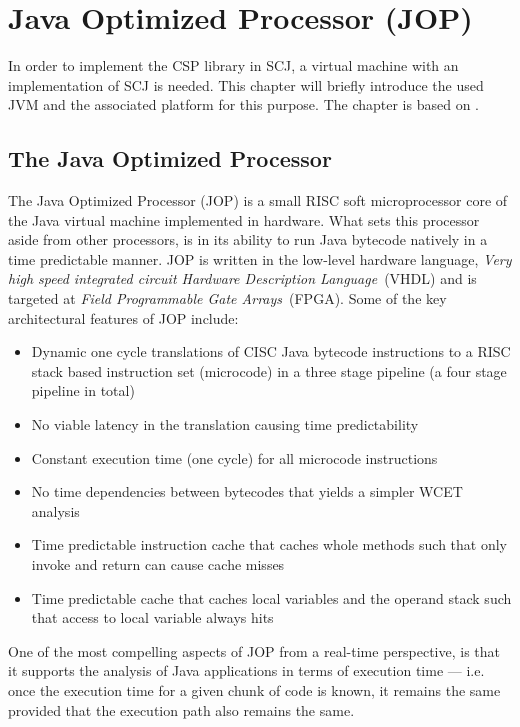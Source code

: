 \chapter{Java Optimized Processor (JOP)}
\label{chapter:jop}
In order to implement the CSP library in SCJ, a virtual machine with an implementation of SCJ is needed. This chapter will briefly introduce the used JVM and the associated platform for this purpose. The chapter is based on \cite{Schoeberl_ajava, JOPDesign, jop:handbook}.

\section{The Java Optimized Processor}
The Java Optimized Processor (JOP) is a small RISC soft microprocessor core of the Java virtual machine implemented in hardware. What sets this processor aside from other processors, is in its ability to run Java bytecode natively in a time predictable manner. JOP is written in the low-level hardware language, \textit{Very high speed integrated circuit Hardware Description Language}~(VHDL) and is targeted at \textit{Field Programmable Gate Arrays}~(FPGA). Some of the key architectural features of JOP include:

\begin{itemize}
 	\item Dynamic one cycle translations of CISC Java bytecode instructions to a RISC stack based instruction set (microcode) in a three stage pipeline (a four stage pipeline in total)
 	\item No viable latency in the translation causing time predictability
 	\item Constant execution time (one cycle) for all microcode instructions
 	\item No time dependencies between bytecodes that yields a simpler WCET analysis
 	\item Time predictable instruction cache that caches whole methods such that only invoke and return can cause cache misses
 	\item Time predictable cache that caches local variables and the operand stack such that access to local variable always hits
\end{itemize}
One of the most compelling aspects of JOP from a real-time perspective, is that it supports the analysis of Java applications in terms of execution time --- i.e. once the execution time for a given chunk of code is known, it remains the same provided that the execution path also remains the same. 

